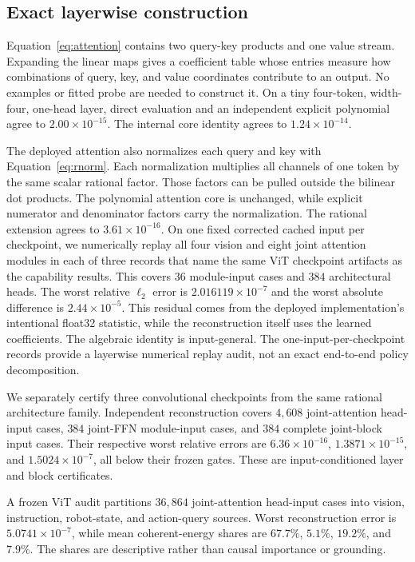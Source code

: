 \documentclass{article}
\begin{document}
\subsection{Exact layerwise construction}

Equation~\ref{eq:attention} contains two query-key products and one value stream. Expanding
the linear maps gives a coefficient table whose entries measure how combinations of query,
key, and value coordinates contribute to an output. No examples or fitted probe are needed to
construct it. On a tiny four-token, width-four, one-head layer, direct evaluation
and an independent explicit polynomial agree to $2.00\times10^{-15}$. The internal core
identity agrees to $1.24\times10^{-14}$.

The deployed attention also normalizes each query and key with Equation~\ref{eq:rnorm}.
Each normalization multiplies all channels of one token by the same scalar rational factor.
Those factors can be pulled outside the bilinear dot products. The polynomial attention core
is unchanged, while explicit numerator and denominator factors carry the normalization.
The rational extension agrees to $3.61\times10^{-16}$. On one fixed corrected cached input per checkpoint,
we numerically replay all four vision and eight joint attention modules in each of three records
that name the same ViT checkpoint artifacts as the capability results. This covers $36$
module-input cases and $384$ architectural heads. The worst relative $\ell_2$ error is
$2.016119\times10^{-7}$ and the worst absolute difference
is $2.44\times10^{-5}$. This residual comes from the deployed implementation's intentional
float32 statistic, while the reconstruction itself uses the learned coefficients. The algebraic
identity is input-general. The one-input-per-checkpoint records provide a layerwise numerical
replay audit, not an exact end-to-end policy decomposition.

We separately certify three convolutional checkpoints from the same rational architecture family.
Independent reconstruction covers $4{,}608$ joint-attention head-input cases, $384$ joint-FFN
module-input cases, and $384$ complete joint-block input cases. Their respective worst relative
errors are $6.36\times10^{-16}$, $1.3871\times10^{-15}$, and $1.5024\times10^{-7}$, all below
their frozen gates. These are input-conditioned layer and block certificates.

A frozen ViT audit partitions $36{,}864$ joint-attention head-input cases into vision,
instruction, robot-state, and action-query sources. Worst reconstruction error is
$5.0741\times10^{-7}$, while mean coherent-energy shares are $67.7\%$, $5.1\%$, $19.2\%$,
and $7.9\%$. The shares are descriptive rather than causal importance or grounding.
\end{document}
